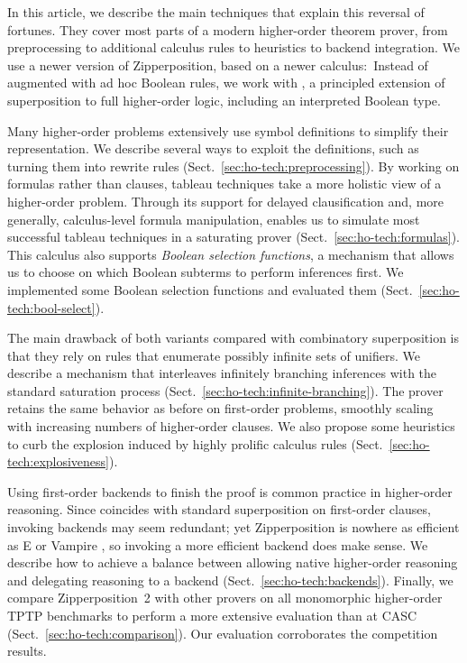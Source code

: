 \documentclass[smallcondensed,draft]{svjour3}     %
\begin{document}
In this article, we describe the main techniques that explain this reversal
of fortunes. They cover most parts of a modern higher-order theorem prover, from
preprocessing to additional calculus rules to heuristics to backend
integration. We use a newer version of Zipperposition, based on a newer
calculus:\ Instead of \lsup{} augmented with ad hoc Boolean rules,
we work with \emph{\osup} \cite{bbtv-21-full-ho-sup}, a principled extension of superposition to full
higher-order logic, including an interpreted Boolean type.

Many higher-order problems extensively use symbol definitions to simplify
their representation. We describe several ways to exploit the definitions,
such as turning them into rewrite rules (Sect.~\ref{sec:ho-tech:preprocessing}).
%
By working on formulas rather than clauses, tableau techniques take a more
holistic view of a higher-order problem.
Through its support for delayed clausification and, more generally,
calculus-level formula manipulation, \osup{} enables us to
simulate most successful tableau techniques in a saturating prover
(Sect.~\ref{sec:ho-tech:formulas}). This calculus also supports \emph{Boolean selection
functions}, a mechanism that allows us to choose on which Boolean subterms
to perform inferences first.
We implemented some Boolean selection functions and
evaluated them (Sect.~\ref{sec:ho-tech:bool-select}).

The main drawback of both \lsup{} variants compared with combinatory
superposition is that they rely on rules that enumerate possibly infinite sets
of unifiers. We describe a mechanism that interleaves infinitely
branching inferences with the standard saturation process
(Sect.~\ref{sec:ho-tech:infinite-branching}). The prover
retains the same behavior as
before on first-order problems, smoothly scaling with
increasing numbers of higher-order clauses.
%
We also propose some heuristics to curb the explosion induced by highly
prolific calculus rules (Sect.~\ref{sec:ho-tech:explosiveness}).

Using first-order backends to finish the proof is common practice in
higher-order reasoning. Since \lsup{} coincides with standard
superposition on first-order clauses, invoking backends may
seem redundant; yet Zipperposition is nowhere as efficient as E
\cite{scv-19-e23} or Vampire \cite{lkav-13-vampire}, so invoking a more
efficient backend does make sense. We describe how to achieve a balance
between allowing native higher-order reasoning and
delegating reasoning to a backend (Sect.~\ref{sec:ho-tech:backends}).
%
Finally, we compare Zipperposition~2 with other provers on all monomorphic
higher-order TPTP benchmarks \cite{gs-17-tptp} to perform a more extensive
evaluation than at CASC (Sect.~\ref{sec:ho-tech:comparison}). Our evaluation
corroborates the competition results.
\end{document}
